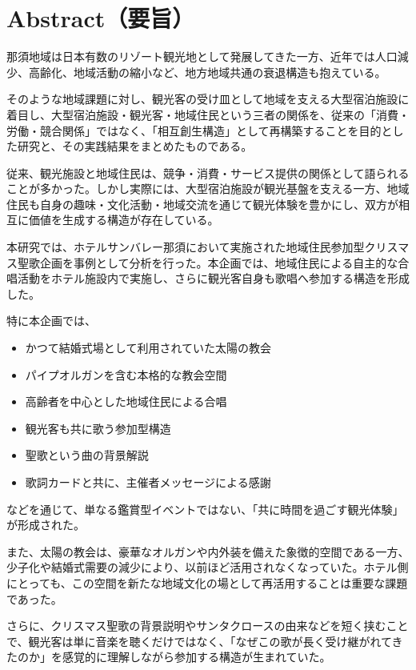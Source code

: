 \section*{Abstract（要旨）}

那須地域は日本有数のリゾート観光地として発展してきた一方、近年では人口減少、高齢化、地域活動の縮小など、地方地域共通の衰退構造も抱えている。

そのような地域課題に対し、観光客の受け皿として地域を支える大型宿泊施設に着目し、大型宿泊施設・観光客・地域住民という三者の関係を、従来の「消費・労働・競合関係」ではなく、「相互創生構造」として再構築することを目的とした研究と、その実践結果をまとめたものである。

従来、観光施設と地域住民は、競争・消費・サービス提供の関係として語られることが多かった。しかし実際には、大型宿泊施設が観光基盤を支える一方、地域住民も自身の趣味・文化活動・地域交流を通じて観光体験を豊かにし、双方が相互に価値を生成する構造が存在している。

本研究では、ホテルサンバレー那須において実施された地域住民参加型クリスマス聖歌企画を事例として分析を行った。本企画では、地域住民による自主的な合唱活動をホテル施設内で実施し、さらに観光客自身も歌唱へ参加する構造を形成した。

特に本企画では、

\begin{itemize}
\item かつて結婚式場として利用されていた太陽の教会
\item パイプオルガンを含む本格的な教会空間
\item 高齢者を中心とした地域住民による合唱
\item 観光客も共に歌う参加型構造
\item 聖歌という曲の背景解説
\item 歌詞カードと共に、主催者メッセージによる感謝
\end{itemize}

などを通じて、単なる鑑賞型イベントではない、「共に時間を過ごす観光体験」が形成された。

また、太陽の教会は、豪華なオルガンや内外装を備えた象徴的空間である一方、少子化や結婚式需要の減少により、以前ほど活用されなくなっていた。ホテル側にとっても、この空間を新たな地域文化の場として再活用することは重要な課題であった。

さらに、クリスマス聖歌の背景説明やサンタクロースの由来などを短く挟むことで、観光客は単に音楽を聴くだけではなく、「なぜこの歌が長く受け継がれてきたのか」を感覚的に理解しながら参加する構造が生まれていた。

